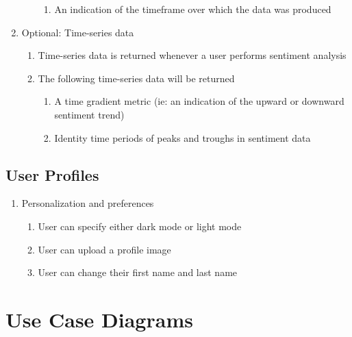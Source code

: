 \documentclass[12pt]{article}
\begin{document}
\begin{enumerate}
\begin{enumerate}
\begin{enumerate}
                  \item An indication of the timeframe over which the data was produced
                \end{enumerate}
        \end{enumerate}
  \item Optional: Time-series data
        \begin{enumerate}
          \item Time-series data is returned whenever a user performs sentiment analysis
          \item The following time-series data will be returned
                \begin{enumerate}
                  \item A time gradient metric (ie: an indication of the upward or downward sentiment trend)
                  \item Identity time periods of peaks and troughs in sentiment data
                \end{enumerate}
        \end{enumerate}
\end{enumerate}

\subsection{User Profiles}
\begin{enumerate}
  \item Personalization and preferences
        \begin{enumerate}
          \item User can specify either dark mode or light mode
          \item User can upload a profile image
          \item User can change their first name and last name
        \end{enumerate}
\end{enumerate}

\newpage
\section{Use Case Diagrams}
\end{document}
